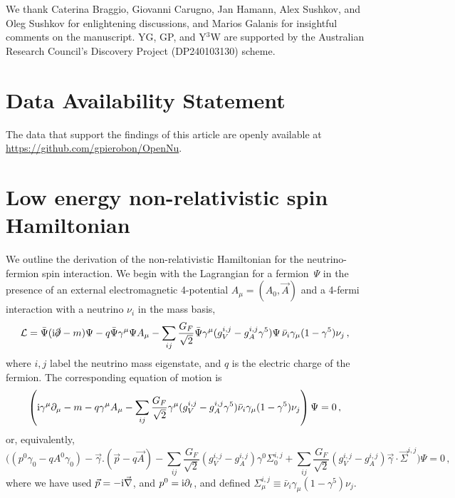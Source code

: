 \documentclass[aps,prd,10pt,twocolumn,superscriptaddress,floatfix,nofootinbib,amsmath,amssymb,altaffilletter,preprintnumbers]{revtex4-1}
\begin{document}

\acknowledgments

We thank Caterina Braggio, Giovanni Carugno, Jan Hamann, Alex Sushkov, and Oleg Sushkov for enlightening discussions, and Marios Galanis for insightful comments on the manuscript. YG, GP, and Y$^3$W are supported by the Australian Research Council's Discovery Project (DP240103130) scheme. 

\section*{Data Availability Statement}

The data that support the findings of this article are openly available at \url{https://github.com/gpierobon/OpenNu}.





\newpage

\onecolumngrid
\appendix



\section{Low energy non-relativistic spin Hamiltonian}
\label{app:ham}

We outline the derivation of the non-relativistic Hamiltonian for the neutrino-fermion spin interaction. We begin with the Lagrangian for a fermion~$\Psi$ in the presence of an external electromagnetic 4-potential  $A_{\mu}=(A_{0},\vec{A})$ and a 4-fermi interaction with a neutrino $\nu_i$ in the mass basis, 
\begin{align}
  \mathcal{L} = \bar{\Psi}({\rm i}\slashed{\partial} - m)\Psi - q\bar{\Psi}\gamma^\mu\Psi A_\mu 
    - \sum_{ij} \frac{G_F}{\sqrt{2}} \bar{\Psi}\gamma^\mu(g^{i,j}_V - g^{i,j}_A \gamma^5)\Psi \, \bar{\nu}_i \gamma_\mu (1 - \gamma^5) \nu_j \, ,
  \label{eq:lagmodapp}
\end{align}
where $i,j$ label the neutrino mass eigenstate, and $q$ is the electric charge of the fermion. 
The corresponding equation of motion is
\begin{equation}
\left({\rm i} \gamma^\mu \partial_\mu-m-q\gamma^\mu A_\mu - \sum_{ij}\frac{G_F}{\sqrt{2}}\gamma^\mu(g^{i,j}_V-g^{i,j}_A\gamma^5) \bar{\nu}_i\gamma_\mu(1-\gamma^5)\nu_j  \right)\Psi=0\, ,
\end{equation}
or, equivalently,
\begin{equation}
    \Bigg((p^{0}\gamma_{0} -q A^{0}\gamma_{0}) - \vec{\gamma}.(\vec{p} -q \vec{A}) - \sum_{ij} \frac{G_{F}}{\sqrt{2}} \left(g_{V}^{i,j} -g_{A}^{i,j}  \right)\gamma^{0}\Sigma_{0}^{i,j}+ \sum_{ij} \frac{G_{F}}{\sqrt{2}}\left(g_{V}^{i,j} -g_{A}^{i,j}  \right)\vec{\gamma}\cdot \vec{\Sigma}^{i,j}   \Bigg)\Psi =0\, ,
    \label{eq:dirac}
    \end{equation}
where we have used $\vec{p}= -{\rm i} \vec{\nabla}$, and $p^0={\rm i}\partial_{t}$, and 
defined $\Sigma^{i,j}_\mu \equiv \bar{\nu}_i\gamma_\mu(1-\gamma^5)\nu_j$. 
\end{document}
